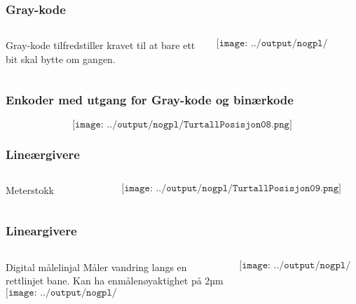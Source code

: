 \documentclass[aspectratio=169,xcolor=dvipsnames]{beamer}
\begin{document}
\begin{frame}
	\frametitle{Gray-kode}
	\begin{columns}
		\begin{column}{0.5\textwidth}
Gray-kode tilfredstiller kravet til at bare ett bit skal bytte om gangen. 
			
		\end{column}

		\begin{column}{0.5\textwidth}
	$$\texttt{[image: ../output/nogpl/TurtallPosisjon07.png]}$$
		\end{column}
	\end{columns}
\end{frame}

\begin{frame}
	\frametitle{Enkoder med utgang for Gray-kode og binærkode}
	$$\texttt{[image: ../output/nogpl/TurtallPosisjon08.png]}$$
\end{frame}

\begin{frame}
	\frametitle{Lineærgivere}
	\begin{columns}
		\begin{column}{0.5\textwidth}
Meterstokk
			
		\end{column}

		\begin{column}{0.5\textwidth}
	$$\texttt{[image: ../output/nogpl/TurtallPosisjon09.png]}$$
		\end{column}
	\end{columns}
\end{frame}

\begin{frame}
	\frametitle{Lineargivere}
	\begin{columns}
		\begin{column}{0.5\textwidth}
Digital målelinjal
\vskip 12pt
Måler vandring langs en rettlinjet bane. Kan ha enmålenøyaktighet på 2µm
	$$\texttt{[image: ../output/nogpl/TurtallPosisjon10.png]}$$
			
		\end{column}

		\begin{column}{0.5\textwidth}
	$$\texttt{[image: ../output/nogpl/TurtallPosisjon11.png]}$$
		\end{column}
	\end{columns}
\end{frame}
\end{document}
